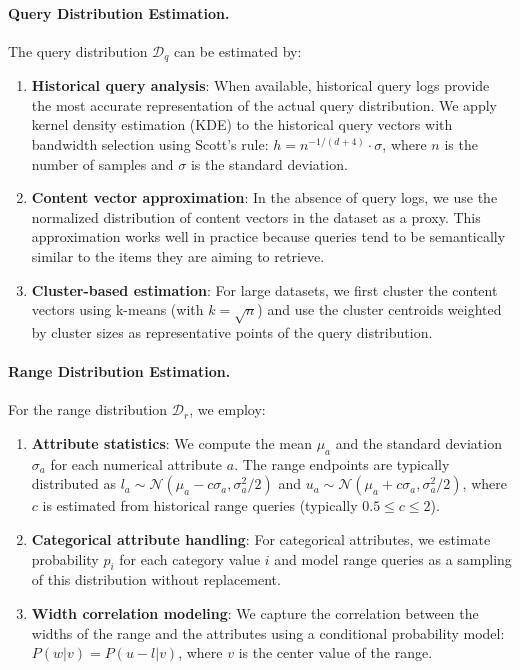 \documentclass[numbers,sort]{article}
\begin{document}
\paragraph{Query Distribution Estimation.} The query distribution $\mathcal{D}_q$ can be estimated by:
\begin{enumerate}
    \item \textbf{Historical query analysis}: When available, historical query logs provide the most accurate representation of the actual query distribution. We apply kernel density estimation (KDE) to the historical query vectors with bandwidth selection using Scott's rule: $h = n^{-1/(d+4)} \cdot \sigma$, where $n$ is the number of samples and $\sigma$ is the standard deviation.
    
    \item \textbf{Content vector approximation}: In the absence of query logs, we use the normalized distribution of content vectors in the dataset as a proxy. This approximation works well in practice because queries tend to be semantically similar to the items they are aiming to retrieve.
    
    \item \textbf{Cluster-based estimation}: For large datasets, we first cluster the content vectors using k-means (with $k = \sqrt{n}$) and use the cluster centroids weighted by cluster sizes as representative points of the query distribution.
\end{enumerate}

\paragraph{Range Distribution Estimation.} For the range distribution $\mathcal{D}_r$, we employ:
\begin{enumerate}
    \item \textbf{Attribute statistics}: We compute the mean $\mu_a$ and the standard deviation $\sigma_a$ for each numerical attribute $a$. The range endpoints are typically distributed as $l_a \sim \mathcal{N}(\mu_a - c\sigma_a, \sigma_a^2/2)$ and $u_a \sim \mathcal{N}(\mu_a + c\sigma_a, \sigma_a^2/2)$, where $c$ is estimated from historical range queries (typically $0.5 \leq c \leq 2$).
    
    \item \textbf{Categorical attribute handling}: For categorical attributes, we estimate probability $p_i$ for each category value $i$ and model range queries as a sampling of this distribution without replacement.
    
    \item \textbf{Width correlation modeling}: We capture the correlation between the widths of the range and the attributes using a conditional probability model: $P(w|v) = P(u-l|v)$, where $v$ is the center value of the range.
\end{enumerate}
\end{document}
